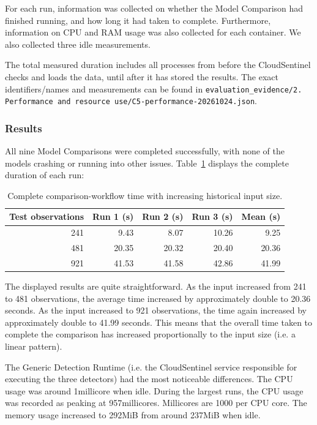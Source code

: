 For each run, information was collected on whether the Model Comparison had finished running, and how long it had taken to complete. Furthermore, information on CPU and RAM usage was also collected for each container. We also collected three idle measurements.

The total measured duration includes all processes from before the CloudSentinel checks and loads the data, until after it has stored the results. The exact identifiers/names and measurements can be found in \texttt{evaluation\_evidence/2. Performance and resource use/C5-performance-20261024.json}.

\subsubsection{Results}

All nine Model Comparisons were completed successfully, with none of the models crashing or running into other issues. Table~\ref{tab:h9-input-scaling-results} displays the complete duration of each run:

\begin{table}[H]
    \centering
    \small
    \caption{Complete comparison-workflow time with increasing historical input size.}
    \label{tab:h9-input-scaling-results}
    \begin{tabular}{|r|r|r|r|r|}
        \hline
        Test observations & Run 1 (s) & Run 2 (s) & Run 3 (s) & Mean (s) \\
        \hline
        241 & 9.43 & 8.07 & 10.26 & 9.25 \\
        481 & 20.35 & 20.32 & 20.40 & 20.36 \\
        921 & 41.53 & 41.58 & 42.86 & 41.99 \\
        \hline
    \end{tabular}
\end{table}

The displayed results are quite straightforward. As the input increased from 241 to 481 observations, the average time increased by approximately double to 20.36 seconds. As the input increased to 921 observations, the time again increased by approximately double to 41.99 seconds. This means that the overall time taken to complete the comparison has increased proportionally to the input size (i.e. a linear pattern).

The Generic Detection Runtime (i.e. the CloudSentinel service responsible for executing the three detectors) had the most noticeable differences. The CPU usage was around 1millicore when idle. During the largest runs, the CPU usage was recorded as peaking at 957millicores. Millicores are 1000 per CPU core. The memory usage increased to 292MiB from around 237MiB when idle.


